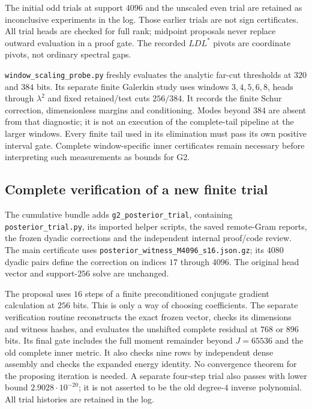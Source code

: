 \documentclass[11pt]{article}
\theoremstyle{remark}
\begin{document}
The initial odd trials at support $4096$ and the unscaled even
trial are retained as inconclusive experiments in the log. Those
earlier trials are not sign certificates.
All trial heads are checked for full rank; midpoint proposals never
replace outward evaluation in a proof gate. The recorded $LDL^*$
pivots are coordinate pivots, not ordinary spectral gaps.

\texttt{window\_scaling\_probe.py} freshly evaluates the analytic
far-cut thresholds at $320$ and $384$ bits. Its separate finite
Galerkin study uses windows $3,4,5,6,8$, heads through $\lambda^2$
and fixed retained/test cuts $256/384$. It records the finite
Schur correction, dimensionless margins and conditioning. Modes
beyond $384$ are absent from that diagnostic; it is not an execution
of the complete-tail pipeline at the larger windows. Every finite
tail used in its elimination must pass its own positive interval
gate. Complete window-specific inner certificates remain necessary
before interpreting such measurements as bounds for G2.

\subsection*{Complete verification of a new finite trial}
\label{app:v124-posterior}
The cumulative bundle adds \texttt{g2\_posterior\_trial}, containing
\nolinkurl{posterior_trial.py}, its imported helper scripts, the
saved remote-Gram reports, the frozen dyadic corrections and the
independent internal proof/code review. The main certificate uses
\nolinkurl{posterior_witness_M4096_s16.json.gz}; its $4080$ dyadic
pairs define the correction on indices $17$ through $4096$.
The original head vector and support-$256$ solve are unchanged.

The proposal uses $16$ steps of a finite preconditioned conjugate
gradient calculation at $256$ bits. This is only a way of choosing
coefficients. The separate verification routine reconstructs the
exact frozen vector, checks its dimensions and witness hashes,
and evaluates the unshifted complete residual at $768$ or $896$
bits. Its final gate includes the full moment remainder beyond
$J=65536$ and the old complete inner metric. It also checks nine
rows by independent dense assembly and checks the expanded energy
identity. No convergence theorem for the proposing iteration is
needed. A separate four-step trial also passes with lower bound
$2.9028\cdot10^{-20}$; it is not asserted to be the old degree-$4$
inverse polynomial. All trial histories are retained in the log.
\end{document}
